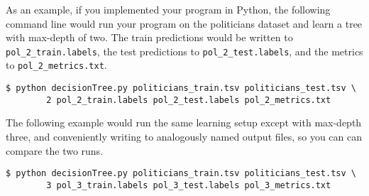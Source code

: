 \documentclass[11pt,addpoints,answers]{exam}
\begin{document}
As an example, if you implemented your program in Python, the following command line would run your program on the politicians dataset and learn a tree with max-depth of two. The train predictions would be written to \lstinline{pol_2_train.labels}, the test predictions to \lstinline{pol_2_test.labels}, and the metrics to \lstinline{pol_2_metrics.txt}.
%
\begin{lstlisting}[language=Shell]
$ python decisionTree.py politicians_train.tsv politicians_test.tsv \ 
        2 pol_2_train.labels pol_2_test.labels pol_2_metrics.txt
\end{lstlisting}
%
The following example would run the same learning setup except with max-depth three, and conveniently writing to analogously named output files, so you can can compare the two runs.
%
\begin{lstlisting}[language=Shell]
$ python decisionTree.py politicians_train.tsv politicians_test.tsv \ 
        3 pol_3_train.labels pol_3_test.labels pol_3_metrics.txt
\end{lstlisting}
\end{document}
